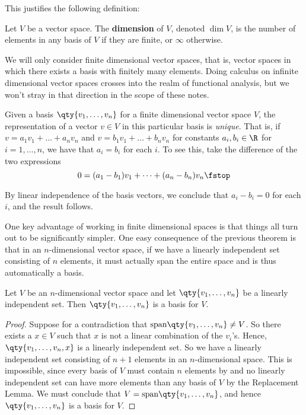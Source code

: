 This justifies the following definition:
\begin{definition}
  Let \( V \) be a vector space. The \textbf{dimension} of \( V \), denoted \( \dim V \), is the number of elements in any basis of \( V \) if they are finite, or \( \infty \) otherwise.
\end{definition}

We will only consider finite dimensional vector spaces, that is, vector spaces in which there exists a basis with finitely many elements. Doing calculus on infinite dimensional vector spaces crosses into the realm of functional analysis, but we won't stray in that direction in the scope of these notes.

\vspace{3mm}

Given a basis \( \qty{v_1,\dots,v_n} \) for a finite dimensional vector space \( V \), the representation of a vector \( v\in V \) in this particular basis is \emph{unique}. That is, if \( v=a_1v_1+\dots+a_nv_n \) and \( v=b_1v_1+\dots+b_nv_n \) for constants \( a_i,b_i\in\R \) for \( i=1,\dots, n \), we have that \( a_i=b_i \) for each \( i \). To see this, take the difference of the two expressions
\[ 0=(a_1-b_1)v_1+\dots+(a_n-b_n)v_n\fstop \]

By linear independence of the basis vectors, we conclude that \( a_i-b_i=0 \) for each \( i \), and the result follows.

\vspace{3mm}

One key advantage of working in finite dimensional spaces is that things all turn out to be significantly simpler. One easy consequence of the previous theorem is that in an \( n \)-dimensional vector space, if we have a linearly independent set consisting of \( n \) elements, it must actually span the entire space and is thus automatically a basis.
\begin{corollary}
  Let \( V \) be an \( n \)-dimensional vector space and let \( \qty{v_1,\dots,v_n} \) be a linearly independent set. Then \( \qty{v_1,\dots,v_n} \) is a basis for \( V \).
\end{corollary}
\begin{proof}
  Suppose for a contradiction that \( \text{span}\qty{v_1,\dots,v_n}\neq V \). So there exists a \( x\in V \) such that \( x \) is not a linear combination of the \( v_i \)'s. Hence, \( \qty{v_1,\dots,v_n,x} \) is a linearly independent set. So we have a linearly independent set consisting of \( n+1 \) elements in an \( n \)-dimensional space. This is impossible, since every basis of \( V \) must contain \( n \) elements by  and no linearly independent set can have more elements than any basis of \( V \) by the Replacement Lemma. We must conclude that \( V=\text{span}\qty{v_1,\dots,v_n} \), and hence \( \qty{v_1,\dots,v_n} \) is a basis for \( V \).
\end{proof}

